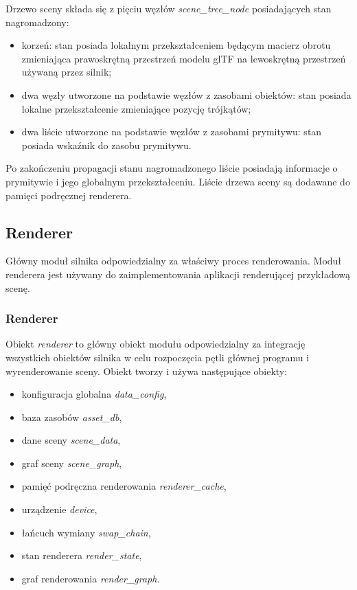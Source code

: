 Drzewo sceny składa się z pięciu węzłów \textit{scene\_tree\_node} posiadających stan nagromadzony:
\begin{itemize}
	\item korzeń: stan posiada lokalnym przekształceniem będącym macierz obrotu zmieniająca prawoskrętną przestrzeń modelu glTF na lewoskrętną przestrzeń używaną przez silnik;
	\item dwa węzły utworzone na podstawie węzłów z zasobami obiektów: stan posiada lokalne przekształcenie zmieniające pozycję trójkątów;
	\item dwa liście utworzone na podstawie węzłów z zasobami prymitywu: stan posiada wskaźnik do zasobu prymitywu.
\end{itemize}
Po zakończeniu propagacji stanu nagromadzonego liście posiadają informacje o prymitywie i jego globalnym przekształceniu.
Liście drzewa sceny są dodawane do pamięci podręcznej renderera.


\subsection{Renderer}

Główny moduł silnika odpowiedzialny za właściwy proces renderowania.
Moduł renderera jest używany do zaimplementowania aplikacji renderującej przykładową scenę.


\subsubsection{Renderer}
Obiekt \textit{renderer} to główny obiekt modułu odpowiedzialny za integrację wszystkich obiektów silnika w celu rozpoczęcia pętli głównej programu i wyrenderowanie sceny.
Obiekt tworzy i używa następujące obiekty:
\begin{itemize}
	\item konfiguracja globalna \textit{data\_config},
	\item baza zasobów \textit{asset\_db},
	\item dane sceny \textit{scene\_data},
	\item graf sceny \textit{scene\_graph},
	\item pamięć podręczna renderowania \textit{renderer\_cache},
	\item urządzenie \textit{device},
	\item łańcuch wymiany \textit{swap\_chain},
	\item stan renderera \textit{render\_state},
	\item graf renderowania \textit{render\_graph}.
\end{itemize}

